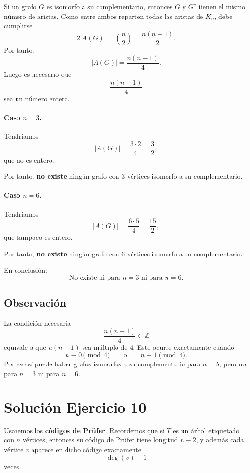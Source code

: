\documentclass[12pt]{article}
\begin{document}
\begin{enumerate}
    Si un grafo \(G\) es isomorfo a su complementario, entonces \(G\) y \(G^c\) tienen el mismo número de aristas. Como entre ambos reparten todas las aristas de \(K_n\), debe cumplirse
    \[
    2|A(G)|=\binom{n}{2}=\frac{n(n-1)}{2}.
    \]
    Por tanto,
    \[
    |A(G)|=\frac{n(n-1)}{4}.
    \]
    Luego es necesario que
    \[
    \frac{n(n-1)}{4}
    \]
    sea un número entero.

    \paragraph{Caso \(n=3\).}
    Tendríamos
    \[
    |A(G)|=\frac{3\cdot 2}{4}=\frac{3}{2},
    \]
    que no es entero.

    Por tanto, \textbf{no existe} ningún grafo con \(3\) vértices isomorfo a su complementario.

    \paragraph{Caso \(n=6\).}
    Tendríamos
    \[
    |A(G)|=\frac{6\cdot 5}{4}=\frac{15}{2},
    \]
    que tampoco es entero.

    Por tanto, \textbf{no existe} ningún grafo con \(6\) vértices isomorfo a su complementario.

    En conclusión:
    \[
    \boxed{\text{No existe ni para } n=3 \text{ ni para } n=6.}
    \]
\end{enumerate}

\subsection*{Observación}

La condición necesaria
\[
\frac{n(n-1)}{4}\in \mathbb{Z}
\]
equivale a que \(n(n-1)\) sea múltiplo de \(4\). Esto ocurre exactamente cuando
\[
n\equiv 0 \pmod{4}
\qquad \text{o} \qquad
n\equiv 1 \pmod{4}.
\]
Por eso sí puede haber grafos isomorfos a su complementario para \(n=5\), pero no para \(n=3\) ni para \(n=6\).

\section*{Solución Ejercicio 10}

Usaremos los \textbf{códigos de Prüfer}. Recordemos que si \(T\) es un árbol etiquetado con \(n\) vértices, entonces su código de Prüfer tiene longitud \(n-2\), y además cada vértice \(v\) aparece en dicho código exactamente
\[
\deg(v)-1
\]
veces.
\end{document}
